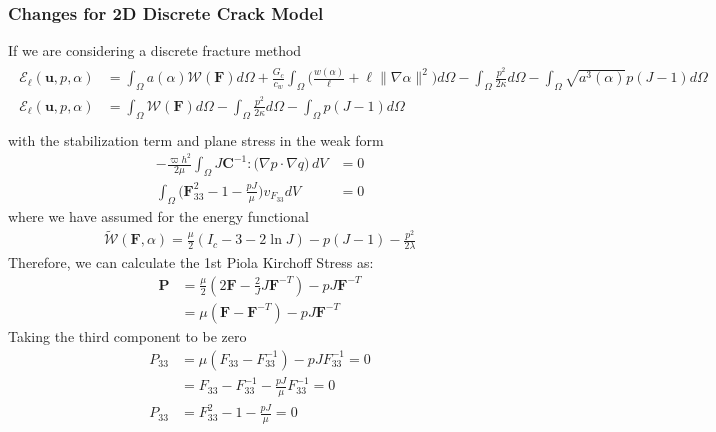 \documentclass[12pt,3p]{article}
\numberwithin{equation}{section}
\begin{document}
\subsubsection{Changes for 2D Discrete Crack Model}
If we are considering a discrete fracture method
\begin{align*}
\begin{split}
\mathcal{E}_{\ell}\left(\boldsymbol{u}, p, \alpha\right) &= \int_{\Omega} a(\alpha) \mathcal{W}(\mathbf{F}) d \Omega + \frac{G_{c}}{c_{w}} \int_{\Omega} \bigg(\frac{w(\alpha)}{\ell}+\ell\|\nabla \alpha\|^{2} \bigg) d \Omega- \int_{\Omega} \frac{p^{2}}{2 \kappa} d \Omega - \int_{\Omega} \sqrt{a^{3}(\alpha)} p(J-1) d \Omega \\
\mathcal{E}_{\ell}\left(\boldsymbol{u}, p, \alpha\right) &= \int_{\Omega} \mathcal{W}(\mathbf{F}) d \Omega - \int_{\Omega} \frac{p^{2}}{2 \kappa} d \Omega - \int_{\Omega} p(J-1) d \Omega \\
\end{split}
\end{align*}
with the stabilization term and plane stress in the weak form 
\begin{align*}
- \frac{\varpi h^2}{2\mu} \int_{\Omega} J \mathbf{C}^{-1} : \big( \nabla p \cdot \nabla q \big) \,dV &= 0 \\
\int_{\Omega} \bigg( \mathbf{F}_{33}^2 - 1 - \frac{p J}{\mu} \bigg) v_{F_{33}} dV &= 0
\end{align*}
where we have assumed for the energy functional 
\begin{align*}
\widetilde{\mathcal{W}} (\mathbf{F}, \alpha) = \frac{\mu}{2} (I_c - 3 - 2 \ln J) - p (J-1) - \frac{p^2}{2 \lambda}
\end{align*}
Therefore, we can calculate the 1st Piola Kirchoff Stress as:
\begin{align*}
\mathbf{P} &= \frac{\mu}{2} (2 \mathbf{F} - \frac{2}{J} J \mathbf{F}^{-T}) - p J \mathbf{F}^{-T} \\
		&= \mu (\mathbf{F} - \mathbf{F}^{-T}) - p J \mathbf{F}^{-T}
\end{align*}
Taking the third component to be zero
\begin{align*}
P_{33} &=  \mu (F_{33} - F_{33}^{-1}) - p J F_{33}^{-1} = 0 \\
		&= F_{33} - F_{33}^{-1} - \frac{p J}{\mu} F_{33}^{-1} = 0 \\
P_{33} &= F_{33}^2 - 1 - \frac{p J}{\mu} = 0
\end{align*}

\end{document}
